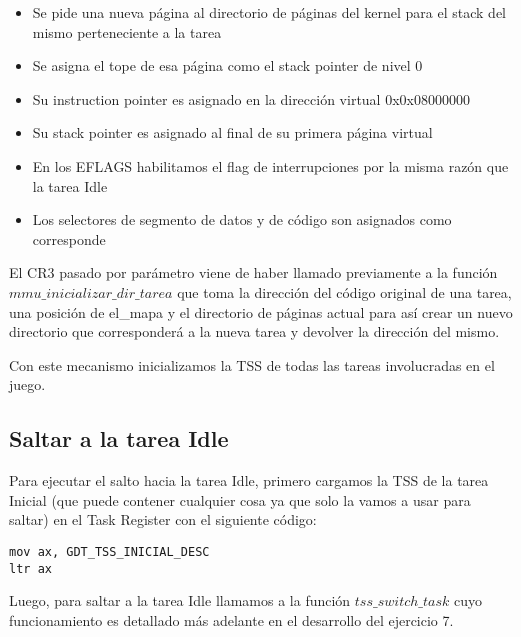\begin{itemize}
	\item Se pide una nueva página al directorio de páginas del kernel para el stack del mismo perteneciente a la tarea
	\item Se asigna el tope de esa página como el stack pointer de nivel 0
	\item Su instruction pointer es asignado en la dirección virtual 0x0x08000000
	\item Su stack pointer es asignado al final de su primera página virtual
	\item En los EFLAGS habilitamos el flag de interrupciones por la misma razón que la tarea Idle
	\item Los selectores de segmento de datos y de código son asignados como corresponde
\end{itemize}

El CR3 pasado por parámetro viene de haber llamado previamente a la función $mmu\_inicializar\_dir\_tarea$ que toma la dirección del código original de una tarea, una posición de el_mapa y el directorio de páginas actual para así crear un nuevo directorio que corresponderá a la nueva tarea y devolver la dirección del mismo.

Con este mecanismo inicializamos la TSS de todas las tareas involucradas en el juego.

\subsection{Saltar a la tarea Idle}

Para ejecutar el salto hacia la tarea Idle, primero cargamos la TSS de la tarea Inicial (que puede contener cualquier cosa ya que solo la vamos a usar para saltar) en el Task Register con el siguiente código:

\begin{lstlisting}
mov ax, GDT_TSS_INICIAL_DESC
ltr ax
\end{lstlisting}

Luego, para saltar a la tarea Idle llamamos a la función $tss\_switch\_task$ cuyo funcionamiento es detallado más adelante en el desarrollo del ejercicio 7.